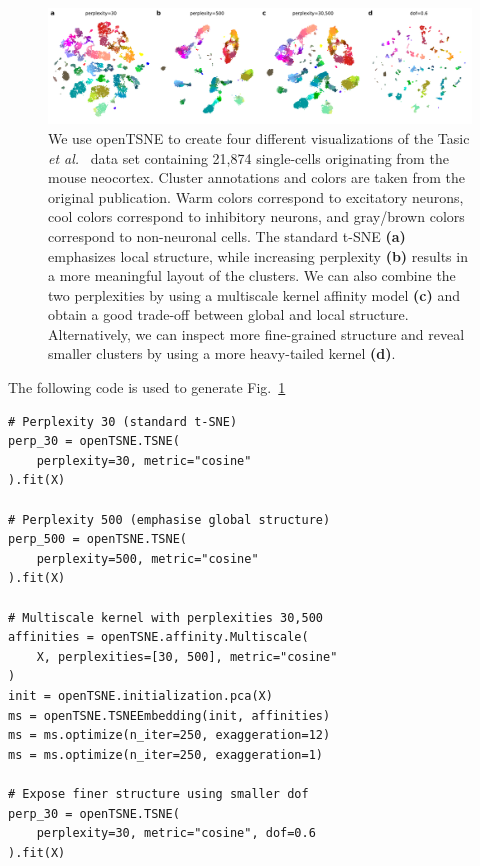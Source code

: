 \documentclass[twocolumn]{bmcart}
\begin{document}
\begin{figure}[htbp]
  \includegraphics[width=\textwidth]{tasic2018}
  \caption{\label{fig:tasic}We use openTSNE to create four different visualizations of the Tasic \textit{et al.}~\cite{tasic2018shared} data set containing 21,874 single-cells originating from the mouse neocortex. Cluster annotations and colors are taken from the original publication. Warm colors correspond to excitatory neurons, cool colors correspond to inhibitory neurons, and gray/brown colors correspond to non-neuronal cells. The standard t-SNE \textbf{(a)} emphasizes local structure, while increasing perplexity \textbf{(b)} results in a more meaningful layout of the clusters. We can also combine the two perplexities by using a multiscale kernel affinity model \textbf{(c)} and obtain a good trade-off between global and local structure. Alternatively, we can inspect more fine-grained structure and reveal smaller clusters by using a more heavy-tailed kernel \textbf{(d)}.}
\end{figure}

The following code is used to generate Fig.~\ref{fig:tasic}
\begin{verbatim}
# Perplexity 30 (standard t-SNE)
perp_30 = openTSNE.TSNE(
    perplexity=30, metric="cosine"
).fit(X)

# Perplexity 500 (emphasise global structure)
perp_500 = openTSNE.TSNE(
    perplexity=500, metric="cosine"
).fit(X)

# Multiscale kernel with perplexities 30,500
affinities = openTSNE.affinity.Multiscale(
    X, perplexities=[30, 500], metric="cosine"
)
init = openTSNE.initialization.pca(X)
ms = openTSNE.TSNEEmbedding(init, affinities)
ms = ms.optimize(n_iter=250, exaggeration=12)
ms = ms.optimize(n_iter=250, exaggeration=1)

# Expose finer structure using smaller dof
perp_30 = openTSNE.TSNE(
    perplexity=30, metric="cosine", dof=0.6
).fit(X)
\end{verbatim}
\end{document}
